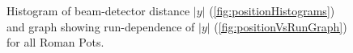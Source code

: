 \begin{figure}[hb]
\centering
\parbox{0.4\textwidth}{
  \centering
  \begin{subfigure}[b]{\linewidth}{
                }
  \end{subfigure}
}
\quad
\parbox{0.545\textwidth}{
  \centering
  \begin{subfigure}[b]{\linewidth}{
                }
  \end{subfigure}
}%
\caption[Beam-detector distance of the Roman Pots in run 15.]{Histogram of beam-detector distance $|y|$ (\ref{fig:positionHistograms}) and graph showing run-dependence of $|y|$ (\ref{fig:positionVsRunGraph}) for all Roman Pots.}%
\end{figure}

